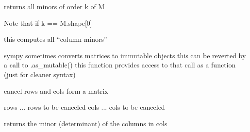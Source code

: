 \documentclass[letterpaper,10pt,english]{sphinxmanual}
\begin{document}
\begin{fulllineitems}
\label{pycontroltools:auxfuncs.math.matrix.all_k_minors}
returns all minors of order k of M

Note that if k == M.shape{[}0{]}

this computes all ``column-minors''

\end{fulllineitems}


\begin{fulllineitems}
\label{pycontroltools:auxfuncs.math.matrix.as_mutable_matrix}
sympy sometimes converts matrices to immutable objects
this can be reverted by a call to    .as\_mutable()
this function provides access to that call as a function
(just for cleaner syntax)

\end{fulllineitems}


\begin{fulllineitems}
\label{pycontroltools:auxfuncs.math.matrix.cancel_rows_cols}
cancel rows and cols form a matrix

rows ... rows to be canceled
cols ... cols to be canceled

\end{fulllineitems}


\begin{fulllineitems}
\label{pycontroltools:auxfuncs.math.matrix.col_degree}
\end{fulllineitems}


\begin{fulllineitems}
\label{pycontroltools:auxfuncs.math.matrix.col_minor}
returns the minor (determinant) of the columns in cols

\end{fulllineitems}
\end{document}
